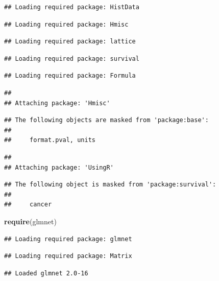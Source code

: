\documentclass[]{article}
\newenvironment{Shaded}{\begin{snugshade}}{\end{snugshade}}
\newcommand{\KeywordTok}[1]{\textcolor[rgb]{0.13,0.29,0.53}{\textbf{#1}}}
\newcommand{\NormalTok}[1]{#1}
\begin{document}
\begin{verbatim}
## Loading required package: HistData
\end{verbatim}

\begin{verbatim}
## Loading required package: Hmisc
\end{verbatim}

\begin{verbatim}
## Loading required package: lattice
\end{verbatim}

\begin{verbatim}
## Loading required package: survival
\end{verbatim}

\begin{verbatim}
## Loading required package: Formula
\end{verbatim}

\begin{verbatim}
## 
## Attaching package: 'Hmisc'
\end{verbatim}

\begin{verbatim}
## The following objects are masked from 'package:base':
## 
##     format.pval, units
\end{verbatim}

\begin{verbatim}
## 
## Attaching package: 'UsingR'
\end{verbatim}

\begin{verbatim}
## The following object is masked from 'package:survival':
## 
##     cancer
\end{verbatim}

\begin{Shaded}
\begin{Highlighting}[]
\KeywordTok{require}\NormalTok{(glmnet)}
\end{Highlighting}
\end{Shaded}

\begin{verbatim}
## Loading required package: glmnet
\end{verbatim}

\begin{verbatim}
## Loading required package: Matrix
\end{verbatim}

\begin{verbatim}
## Loaded glmnet 2.0-16
\end{verbatim}
\end{document}
